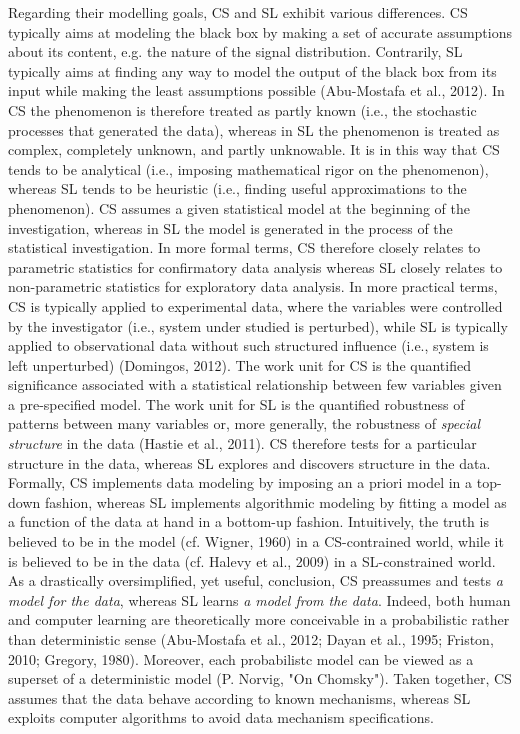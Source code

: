 \documentclass[authoryear,review,3p]{elsarticle}
\begin{document}
Regarding their modelling goals, CS and SL exhibit various differences.
CS typically aims at modeling the black box by making a set of
accurate assumptions about its content,
e.g. the nature of the signal distribution.
Contrarily, SL typically aims at finding any way to model
the output of the black box from its input
while making the least assumptions possible (Abu-Mostafa et al., 2012).
In CS the phenomenon is therefore treated as partly known
(i.e., the stochastic processes that generated the data),
whereas in SL the phenomenon is treated as complex,
completely unknown, and partly unknowable.
It is in this way that CS tends to be
analytical
(i.e., imposing mathematical rigor on the phenomenon),
whereas SL tends to be
heuristic
(i.e., finding useful approximations to the phenomenon).
CS assumes a given statistical model at the beginning of the investigation,
whereas in SL the model is
generated in the process of the statistical investigation.
In more formal terms,
CS therefore closely relates to parametric statistics
for confirmatory data analysis
whereas SL closely relates to non-parametric statistics
for exploratory data analysis.
In more practical terms, CS is typically applied to experimental data,
where the variables were controlled by the investigator
(i.e., system under studied is perturbed),
while SL is typically applied to observational
data without such structured influence
(i.e., system is left unperturbed) (Domingos, 2012).
The work unit for CS is the quantified
significance associated with a statistical
relationship between few variables given a pre-specified model.
The work unit for SL is the quantified robustness of patterns
between many variables or, more generally,
the robustness of \textit{special structure} in the data (Hastie et al., 2011).
CS therefore tests for a particular structure in the data,
whereas SL explores and discovers structure in the data.
Formally, CS implements data modeling by
imposing an a priori model in a top-down fashion,
whereas SL implements algorithmic modeling by fitting
a model as a function of the data at hand in a bottom-up fashion.
%
Intuitively, the truth is believed
to be in the model (cf. Wigner, 1960) in a CS-contrained world,
while it is believed to be in the data
(cf. Halevy et al., 2009) in a SL-constrained world.
As a drastically oversimplified, yet useful, conclusion,
CS preassumes and tests \textit{a model for the data},
whereas SL learns \textit{a model from the data}.
%
Indeed,
both human and computer learning are theoretically
more conceivable in a probabilistic rather than
deterministic sense
(Abu-Mostafa et al., 2012; Dayan et al., 1995; Friston, 2010; Gregory, 1980).
Moreover, each probabilistc model can be viewed as a superset
of a deterministic model (P. Norvig, "On Chomsky").
%
Taken together,
CS assumes that the data behave according to known mechanisms,
whereas SL exploits
computer algorithms to avoid data mechanism specifications.
\end{document}
